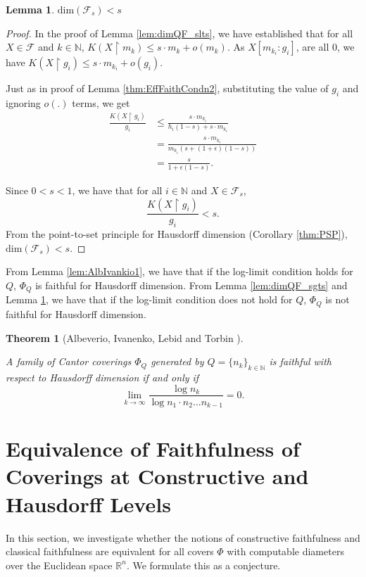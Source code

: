 \documentclass[11pt]{article}
\newtheorem{theorem}{Theorem}
\newtheorem{lemma}{Lemma}
\newcommand{\restr}{\upharpoonright}
\newcommand{\N}{\mathbb{N}}
\newcommand{\R}{\mathbb{R}}
\renewcommand{\dim}{{\mathrm{dim}}}
\newcommand{\F}{{\mathcal{F}}}
\renewcommand{\F}{\mathcal{F}}
\begin{document}
	\begin{lemma}\label{lem:dimF_slts}
		$\dim(\F_s) < s$
	\end{lemma}
	\begin{proof}
		In the proof of Lemma \ref{lem:dimQF_slts}, we have established that for  all $X \in \F$ and $k \in \N$, $K(X \restr m_k) \leq s \cdot m_k +o(m_k)$. As $X[m_{k_i} : g_i]$, are all $0$, we have
		$K(X \restr g_i) \leq s\cdot m_{k_i} + o(g_i).$
		
		Just as in proof of Lemma \ref{thm:EffFaithCondn2}, substituting the value of $g_i$ and ignoring $o(.)$ terms, we get
		\begin{align*}
			\frac{K(X \restr g_i)}{g_i} &\leq \frac{s \cdot m_{k_i}}{h_i(1-s) + s \cdot m_{k_i}} \\
			&= \frac{s \cdot m_{k_i}}{m_{k_i}(s + (1 + \epsilon) (1- s))}\\
			&= \frac{s}{1  + \epsilon (1 - s)}.
		\end{align*}
		
		Since $0<s<1$, we have that for all $i \in \N$ and $X \in \F_s$, 
		$$\frac{K(X \restr g_i)}{g_i} < s.$$
		From the point-to-set principle for Hausdorff dimension (Corollary \ref{thm:PSP}),  $\dim(\F_s) < s$.
	\end{proof}

	From Lemma \ref{lem:AlbIvankio1}, we have that if the log-limit condition holds for $Q$, $\Phi_Q$ is faithful for Hausdorff dimension. From Lemma \ref{lem:dimQF_sgts} and Lemma \ref{lem:dimF_slts}, we have that if the log-limit condition does not hold for $Q$, $\Phi_Q$ is not faithful for Hausdorff dimension.
	 
	\begin{theorem}[Albeverio, Ivanenko, Lebid and Torbin  \cite{Albeverio2020}] \label{thm:AlbIvankio2}
		
		A family of  Cantor coverings $\Phi_Q$ generated by $Q = \{n_k\}_{k \in \N}$ is faithful with respect to Hausdorff dimension if and only if $$
		\lim\limits_{k\rightarrow \infty} \frac{\log n_k}{\log n_1 \cdot n_2
			\dots n_{k-1}} = 0.$$
	\end{theorem}


\section{Equivalence of Faithfulness of Coverings at Constructive and Hausdorff Levels} \label{sec:EqlFaith}


In this section, we investigate whether the notions of constructive faithfulness and classical faithfulness are equivalent for all covers $\Phi$ with computable diameters over the Euclidean space $\R^n$. We formulate this as a conjecture.
\end{document}
